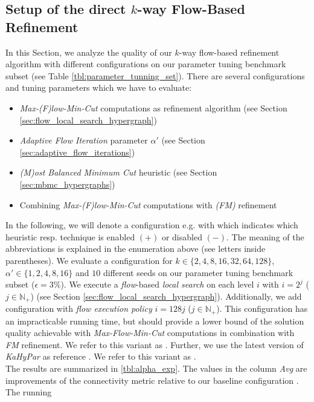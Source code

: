 \subsection{Setup of the direct $k$-way Flow-Based Refinement}
\label{sec:flow_configuration}

In this Section, we analyze the quality of our $k$-way flow-based refinement algorithm with
different configurations on our parameter tuning benchmark subset (see Table \ref{tbl:parameter_tunning_set}).
There are several configurations and tuning parameters which we have to evaluate:
\begin{itemize}
\item \emph{Max-(F)low-Min-Cut} computations as refinement algorithm (see Section \ref{sec:flow_local_search_hypergraph})
\item \emph{Adaptive Flow Iteration} parameter $\alpha'$ (see Section \ref{sec:adaptive_flow_iterations})
\item \emph{(M)ost Balanced Minimum Cut} heuristic (see Section \ref{sec:mbmc_hypergraphs})
\item Combining \emph{Max-(F)low-Min-Cut} computations with \emph{(FM)} refinement
\end{itemize}
In the following, we will denote a configuration e.g. with \FlowVariant{+}{-}{-} which indicates
which heuristic resp. technique is enabled $(+)$ or disabled $(-)$. The meaning of the 
abbreviations is explained in the enumeration above (see letters inside parentheses). We evaluate
a configuration for $k \in \{2,4,8,16,32,64,128\}$, $\alpha' \in \{1,2,4,8,16\}$
and $10$ different seeds on our parameter tuning benchmark subset ($\epsilon = 3\%$). 
We execute a \emph{flow}-based \emph{local search} 
on each level $i$ with $i = 2^j$ ($j \in \mathbb{N}_+$) 
(see Section \ref{sec:flow_local_search_hypergraph}). Additionally, we add configuration
\FlowVariant{+}{+}{+} with \emph{flow execution policy} $i = 128j$ ($j \in \mathbb{N}_+$). 
This configuration has an impracticable running time, but should provide a lower bound
of the solution quality achievable with \emph{Max-Flow-Min-Cut} computations in combination
with \emph{FM} refinement.
We refer to this variant as . Further, we use the 
latest version of \emph{KaHyPar} as reference \cite{heuer2017improving}. We refer to this variant as 
\FlowVariant{-}{-}{+}. \\
The results are summarized in \autoref{tbl:alpha_exp}. The values
in the column \emph{Avg} are improvements of the connectivity metric
relative to our baseline configuration \FlowVariant{-}{-}{+}. The running
